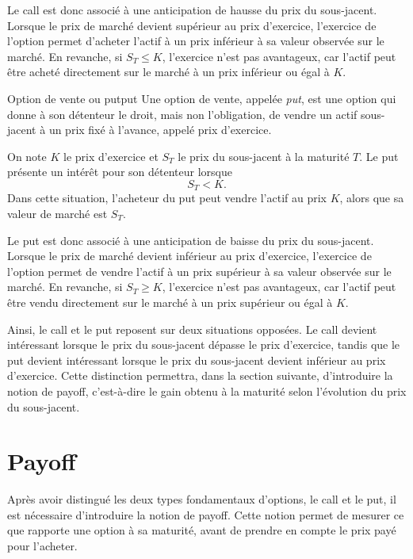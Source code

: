 \documentclass[11pt]{report}
\begin{document}
Le call est donc associé à une anticipation de hausse du prix du sous-jacent. Lorsque le prix de marché devient supérieur au prix d'exercice, l'exercice de l'option permet d'acheter l'actif à un prix inférieur à sa valeur observée sur le marché. En revanche, si $S_T \leq K$, l'exercice n'est pas avantageux, car l'actif peut être acheté directement sur le marché à un prix inférieur ou égal à $K$.

\begin{definition}{Option de vente ou put}{put}
Une option de vente, appelée \textit{put}, est une option qui donne à son détenteur le droit, mais non l'obligation, de vendre un actif sous-jacent à un prix fixé à l'avance, appelé prix d'exercice.

On note $K$ le prix d'exercice et $S_T$ le prix du sous-jacent à la maturité $T$. Le put présente un intérêt pour son détenteur lorsque
\[
S_T < K.
\]
Dans cette situation, l'acheteur du put peut vendre l'actif au prix $K$, alors que sa valeur de marché est $S_T$.
\end{definition}

Le put est donc associé à une anticipation de baisse du prix du sous-jacent. Lorsque le prix de marché devient inférieur au prix d'exercice, l'exercice de l'option permet de vendre l'actif à un prix supérieur à sa valeur observée sur le marché. En revanche, si $S_T \geq K$, l'exercice n'est pas avantageux, car l'actif peut être vendu directement sur le marché à un prix supérieur ou égal à $K$.

Ainsi, le call et le put reposent sur deux situations opposées. Le call devient intéressant lorsque le prix du sous-jacent dépasse le prix d'exercice, tandis que le put devient intéressant lorsque le prix du sous-jacent devient inférieur au prix d'exercice. Cette distinction permettra, dans la section suivante, d'introduire la notion de payoff, c'est-à-dire le gain obtenu à la maturité selon l'évolution du prix du sous-jacent.


\section{Payoff}

Après avoir distingué les deux types fondamentaux d'options, le call et le put, il est nécessaire d'introduire la notion de payoff. Cette notion permet de mesurer ce que rapporte une option à sa maturité, avant de prendre en compte le prix payé pour l'acheter.
\end{document}
